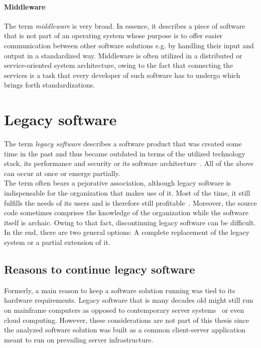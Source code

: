 \documentclass[12pt,a4paper,twoside]{report}
\begin{document}
\paragraph{Middleware}
The term \textit{middleware} is very broad. In essence, it describes a piece
of software that is not part of an operating system whose purpose is to
offer easier communication between other software solutions e.g. by handling
their input and output in a standardized way.
Middleware is often utilized in a distributed or service-oriented system architecture,
owing to the fact that connecting the services is a task that every developer
of such software has to undergo which brings forth standardizations.


\section{Legacy software} \label{sect:legacy-software}

The term \textit{legacy software} describes a software product that was created
some time in the past and thus became outdated in terms of the utilized technology
stack, its performance and security or its software architecture~\cite{seacord-modernizing-legacy}.
All of the above can occur at once or emerge partially.\\
The term often bears a pejorative association, although legacy software
is indispensable for the organization that makes use of it. Most of the time, it
still fulfills the needs of its users and is therefore still profitable~\cite{bennett-coping-legacy}.
Moreover, the source code sometimes comprises the knowledge of the organization while
the software itself is archaic. Owing to that fact, discontinuing legacy software can be difficult.
In the end, there are two general options: A complete replacement of the legacy system or
a partial extension of it.


\subsection{Reasons to continue legacy software} \label{sub-sect:continue-legacy}

Formerly, a main reason to keep a software solution running was tied to its
hardware requirements. Legacy software that is many decades old might still
run on mainframe computers as opposed to contemporary server systems~\cite{schneidewind-preserve-or-redesign}
or even cloud computing. However, these considerations are not part of this thesis
since the analyzed software solution was built as a common client-server application
meant to run on prevailing server infrastructure.
\end{document}
